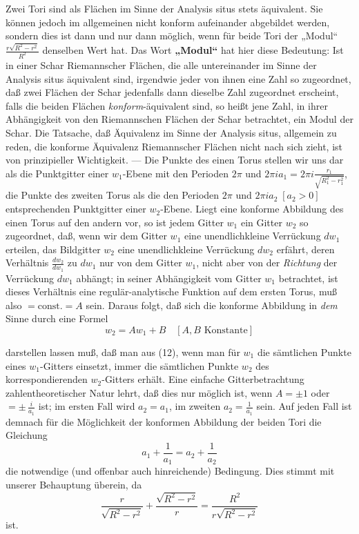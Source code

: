 \documentclass{article}
\begin{document}
Zwei Tori sind als Flächen im Sinne der Analysis situs stets äquivalent. Sie können jedoch im allgemeinen nicht konform aufeinander abgebildet werden, sondern dies ist dann und nur dann möglich, wenn für beide Tori der „Modul“ $\frac{r\sqrt{R^2 - r^2}}{R^2}$ denselben Wert hat. Das Wort \textbf{„Modul“} hat hier diese Bedeutung: Ist in einer Schar Riemannscher Flächen, die alle untereinander im Sinne der Analysis situs äquivalent sind, irgendwie jeder von ihnen eine Zahl so zugeordnet, daß zwei Flächen der Schar jedenfalls dann dieselbe Zahl zugeordnet erscheint, falls die beiden Flächen \emph{konform}-äquivalent sind, so heißt jene Zahl, in ihrer Abhängigkeit von den Riemannschen Flächen der Schar betrachtet, ein Modul der Schar. Die Tatsache, daß Äquivalenz im Sinne der Analysis situs, allgemein zu reden, die konforme Äquivalenz Riemannscher Flächen nicht nach sich zieht, ist von prinzipieller Wichtigkeit. --- Die Punkte des einen Torus stellen wir uns dar als die Punktgitter einer $w_1$-Ebene mit den Perioden $2\pi$ und $2\pi i a_1 = 2\pi i \frac{r_1}{\sqrt{R_1^2 - r_1^2}}$, die Punkte des zweiten Torus als die den Perioden $2\pi$ und $2\pi i a_2\;[a_2 > 0]$ entsprechenden Punktgitter einer $w_2$-Ebene. Liegt eine konforme Abbildung des einen Torus auf den andern vor, so ist jedem Gitter $w_1$ ein Gitter $w_2$ so zugeordnet, daß, wenn wir dem Gitter $w_1$ eine unendlichkleine Verrückung $dw_1$ erteilen, das Bildgitter $w_2$ eine unendlichkleine Verrückung $dw_2$ erfährt, deren Verhältnis $\frac{dw_2}{dw_1}$ zu $dw_1$ nur von dem Gitter $w_1$, nicht aber von der \emph{Richtung} der Verrückung $dw_1$ abhängt; in seiner Abhängigkeit vom Gitter $w_1$ betrachtet, ist dieses Verhältnis eine regulär-analytische Funktion auf dem ersten Torus, muß also $=\mathrm{const.} = A$ sein. Daraus folgt, daß sich die konforme Abbildung in \emph{dem} Sinne durch eine Formel
\[ w_2 = A w_1 + B \quad [A, B \text{ Konstante}] \tag{12} \]

darstellen lassen muß, daß man aus (12), wenn man für $w_1$ die sämtlichen Punkte eines $w_1$-Gitters einsetzt, immer die sämtlichen Punkte $w_2$ des korrespondierenden $w_2$-Gitters erhält. Eine einfache Gitterbetrachtung zahlentheoretischer Natur lehrt, daß dies nur möglich ist, wenn $A = \pm 1$ oder $= \pm\,\frac{i}{a_1}$ ist; im ersten Fall wird $a_2 = a_1$, im zweiten $a_2 = \frac{1}{a_1}$ sein. Auf jeden Fall ist demnach für die Möglichkeit der konformen Abbildung der beiden Tori die Gleichung
\[ a_1 + \frac{1}{a_1} = a_2 + \frac{1}{a_2} \]
die notwendige (und offenbar auch hinreichende) Bedingung. Dies stimmt mit unserer Behauptung überein, da
\[ \frac{r}{\sqrt{R^2 - r^2}} + \frac{\sqrt{R^2 - r^2}}{r} = \frac{R^2}{r\sqrt{R^2 - r^2}} \]
ist.
\end{document}
